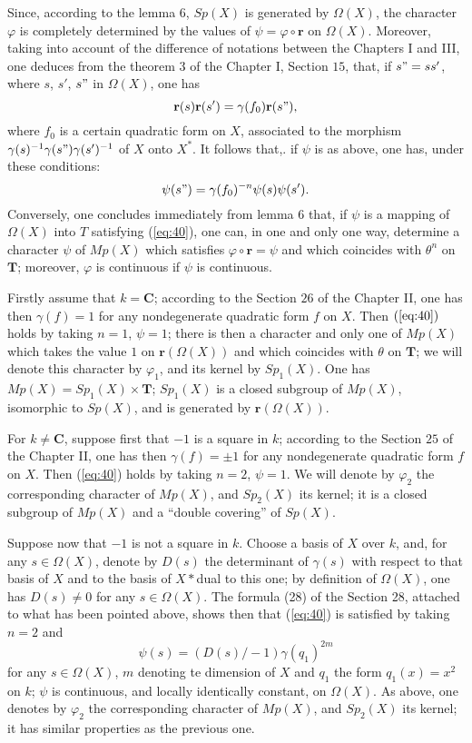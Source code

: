 \documentclass[12pt]{amsart}
\begin{document}
Since, according to the lemma $6$, $Sp(X)$ is generated by $\Omega(X)$,
the character $\varphi$ is completely determined by the values of
$\psi=\varphi\circ\mathbf{r}$ on $\Omega(X)$. Moreover, taking into
account of the difference of notations between the Chapters I and
III, one deduces from the theorem $3$ of the Chapter I, Section $15$,
that, if $s"=ss'$, where $s$, $s'$, $s"$ in $\Omega(X)$, one
has\[
\mathbf{r}(s)\mathbf{r}(s')=\gamma(f_{0})\mathbf{r}(s"),\]
where $f_{0}$ is a certain quadratic form on $X$, associated to
the morphism $\gamma(s)^{-1}\gamma(s")\gamma(s')^{-1}$ of $X$ onto
$X^{*}$. It follows that,. if $\psi$ is as above, one has, under
these conditions:\begin{equation}
\psi(s")=\gamma(f_{0})^{-n}\psi(s)\psi(s').\label{eq:40}\end{equation}
Conversely, one concludes immediately from lemma $6$ that, if $\psi$
is a mapping of $\Omega(X)$ into $T$ satisfying (\ref{eq:40}), one can, in
one and only one way, determine a character $\psi$ of $Mp(X)$ which
satisfies $\varphi\circ\mathbf{r}=\psi$ and which coincides with
$\theta^{n}$ on $\mathbf{T}$; moreover, $\varphi$ is continuous
if $\psi$ is continuous.

Firstly assume that $k=\mathbf{C}$; according to the Section $26$
of the Chapter II, one has then $\gamma(f)=1$ for any nondegenerate
quadratic form $f$ on $X$. Then $(\ref{eq:40})$ holds by taking $n=1$,
$\psi=1$; there is then a character and only one of $Mp(X)$ which
takes the value $1$ on $\mathbf{r}(\Omega(X))$ and which coincides
with $\theta$ on $\mathbf{T}$; we will denote this character by
$\varphi_{1}$, and its kernel by $Sp_{1}(X)$. One has $Mp(X)=Sp_{1}(X)\times\mathbf{T}$;
$Sp_{1}(X)$ is a closed subgroup of $Mp(X)$, isomorphic to $Sp(X)$,
and is generated by $\mathbf{r}(\Omega(X))$.

For $k\neq\mathbf{C}$, suppose first that $-1$ is a square in $k$;
according to the Section $25$ of the Chapter II, one has then $\gamma(f)=\pm1$
for any nondegenerate quadratic form $f$ on $X$. Then (\ref{eq:40}) holds
by taking $n=2$, $\psi=1$. We will denote by $\varphi_{2}$ the
corresponding character of $Mp(X)$, and $Sp_{2}(X)$ its kernel;
it is a closed subgroup of $Mp(X)$ and a {}``double covering''
of $Sp(X)$.

Suppose now that $-1$ is not a square in $k$. Choose a basis of
$X$ over $k$, and, for any $s\in\Omega(X)$, denote by $D(s)$ the
determinant of $\gamma(s)$ with respect to that basis of $X$ and
to the basis of $X*$dual to this one; by definition of $\Omega(X)$,
one has $D(s)\neq0$ for any $s\in\Omega(X)$. The formula (28) of
the Section 28, attached to what has been pointed above, shows then
that (\ref{eq:40}) is satisfied by taking $n=2$ and\[
\psi(s)=(D(s)/-1)\gamma(q_{1})^{2m}\]
for any $s\in\Omega(X)$, $m$ denoting te dimension of $X$ and $q_{1}$
the form $q_{1}(x)=x^{2}$ on $k$; $\psi$ is continuous, and locally
identically constant, on $\Omega(X)$. As above, one denotes by $\varphi_{2}$
the corresponding character of $Mp(X)$, and $Sp_{2}(X)$ its kernel;
it has similar properties as the previous one.
\end{document}
